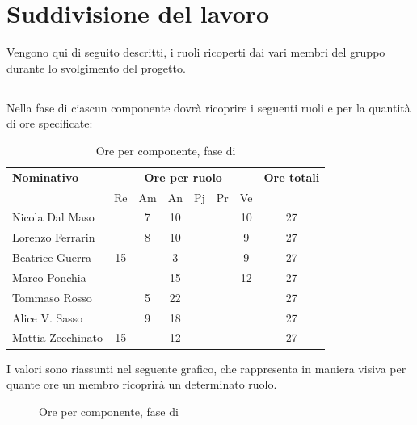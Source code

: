 \section{Suddivisione del lavoro}
Vengono qui di seguito descritti, i ruoli ricoperti dai vari membri del gruppo durante lo svolgimento del progetto.
\subsection{\AR}
Nella fase di \AR ciascun componente dovrà ricoprire i seguenti ruoli e per la quantità di ore specificate:

\begin{table}[H]
	\centering
	\begin{tabular}{|l|c|c|c|c|c|c|c|}
		\hline
		\textbf{Nominativo} & 
		\multicolumn{6}{c|}{\textbf{Ore per ruolo}} & 
		\textbf{Ore totali} \\
		& Re & Am & An & Pj & Pr & Ve & \\
		\hline
		Nicola Dal Maso & & 7 & 10 & & & 10 & 27 \\
		Lorenzo Ferrarin & & 8 & 10 & & & 9 & 27 \\
		Beatrice Guerra & 15 & & 3 & & & 9 & 27 \\
		Marco Ponchia & & & 15 & & & 12 & 27 \\
		Tommaso Rosso & & 5 & 22 & & & & 27 \\
		Alice V. Sasso & & 9 & 18 & & & & 27 \\
		Mattia Zecchinato & 15 & & 12 & & & & 27 \\
		\hline
	\end{tabular}
	\caption{Ore per componente, fase di \AR}
\end{table}
I valori sono riassunti nel seguente grafico, che rappresenta in maniera visiva per quante ore un membro ricoprirà un determinato ruolo.
\begin{figure}[H]
	\centering
	\caption{Ore per componente, fase di \AR}
\end{figure}


